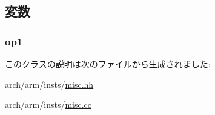 \subsection{変数}
\hypertarget{classMsrRegOp_a4c465c43ad568f8bcf8ae71480e9cfea}{
\subsubsection[{op1}]{ {\bf op1}}}
\label{classMsrRegOp_a4c465c43ad568f8bcf8ae71480e9cfea}


このクラスの説明は次のファイルから生成されました:\begin{DoxyCompactItemize}
\item 
arch/arm/insts/\hyperlink{arch_2arm_2insts_2misc_8hh}{misc.hh}\item 
arch/arm/insts/\hyperlink{arch_2arm_2insts_2misc_8cc}{misc.cc}\end{DoxyCompactItemize}
